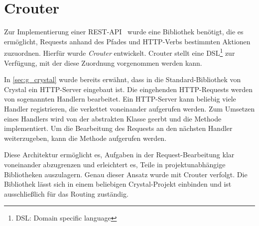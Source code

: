 \section{Crouter}
\label{sec:b_crouter}

Zur Implementierung einer REST-API~\cite{rest} wurde eine Bibliothek benötigt,
die es ermöglicht, Requests anhand des Pfades und HTTP-Verbs bestimmten Aktionen
zuzuordnen.  Hierfür wurde \emph{Crouter} entwickelt.  Crouter stellt eine
DSL\footnote{DSL: Domain specific language} zur Verfügung, mit der diese
Zuordnung vorgenommen werden kann.

In \cref{sec:g_crystal} wurde bereits erwähnt, dass in die Standard-Bibliothek
von Crystal ein HTTP-Server eingebaut ist.  Die eingehenden HTTP-Requests
werden von sogenannten Handlern bearbeitet.  Ein HTTP-Server kann beliebig
viele Handler registrieren, die verkettet voneinander aufgerufen werden.  Zum
Umsetzen eines Handlers wird von der abstrakten Klasse 
geerbt und die Methode  implementiert.  Um die Bearbeitung
des Requests an den nächsten Handler weiterzugeben, kann die Methode
 aufgerufen werden.

Diese Architektur ermöglicht es, Aufgaben in der Request-Bearbeitung klar
voneinander abzugrenzen und erleichtert es, Teile in projektunabhängige
Bibliotheken auszulagern.  Genau dieser Ansatz wurde mit Crouter verfolgt.  Die
Bibliothek lässt sich in einem beliebigen Crystal-Projekt einbinden und ist
ausschließlich für das Routing zuständig.




